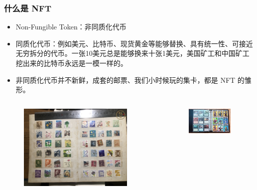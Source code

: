 \documentclass{beamer}
\begin{document}
\begin{frame}
    \frametitle{什么是 NFT}
    \begin{itemize}
        \item Non-Fungible Token：非同质化代币
        \item 同质化代币：例如美元、比特币、现货黄金等能够替换、具有统一性、可接近无穷拆分的代币。一张10美元总是能够换来十张1美元，美国矿工和中国矿工挖出来的比特币永远是一模一样的。
        \item 非同质化代币并不新鲜，成套的邮票、我们小时候玩的集卡，都是 NFT 的雏形。
    \end{itemize}
    \begin{columns}
        \begin{column}{0.5\textwidth}
            \begin{figure}[htbp]
                \centering
                \includegraphics[width=0.9\textwidth]{p4.jpg}
            \end{figure}
        \end{column}
        \begin{column}{0.5\textwidth}
            \begin{figure}[htbp]
                \centering
                \includegraphics[width=0.9\textwidth]{p5.png}
            \end{figure}
        \end{column}
    \end{columns}
\end{frame}
\end{document}
